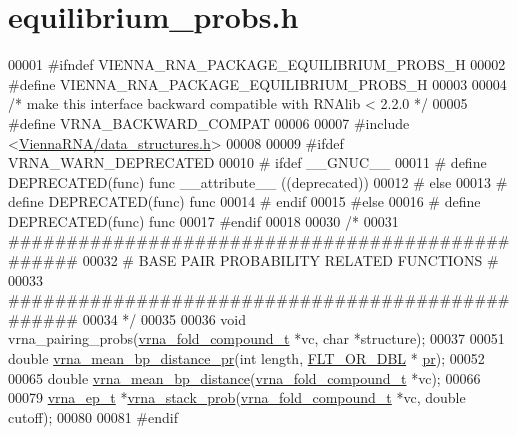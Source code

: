 \hypertarget{equilibrium__probs_8h_source}{}\section{equilibrium\+\_\+probs.\+h}
\label{equilibrium__probs_8h_source}

\begin{DoxyCode}
00001 \textcolor{preprocessor}{#ifndef VIENNA\_RNA\_PACKAGE\_EQUILIBRIUM\_PROBS\_H}
00002 \textcolor{preprocessor}{#define VIENNA\_RNA\_PACKAGE\_EQUILIBRIUM\_PROBS\_H}
00003 
00004 \textcolor{comment}{/* make this interface backward compatible with RNAlib < 2.2.0 */}
00005 \textcolor{preprocessor}{#define VRNA\_BACKWARD\_COMPAT}
00006 
00007 \textcolor{preprocessor}{#include <\hyperlink{data__structures_8h}{ViennaRNA/data\_structures.h}>}
00008 
00009 \textcolor{preprocessor}{#ifdef VRNA\_WARN\_DEPRECATED}
00010 \textcolor{preprocessor}{# ifdef \_\_GNUC\_\_}
00011 \textcolor{preprocessor}{#  define DEPRECATED(func) func \_\_attribute\_\_ ((deprecated))}
00012 \textcolor{preprocessor}{# else}
00013 \textcolor{preprocessor}{#  define DEPRECATED(func) func}
00014 \textcolor{preprocessor}{# endif}
00015 \textcolor{preprocessor}{#else}
00016 \textcolor{preprocessor}{# define DEPRECATED(func) func}
00017 \textcolor{preprocessor}{#endif}
00018 
00030 \textcolor{comment}{/*}
00031 \textcolor{comment}{#################################################}
00032 \textcolor{comment}{# BASE PAIR PROBABILITY RELATED FUNCTIONS       #}
00033 \textcolor{comment}{#################################################}
00034 \textcolor{comment}{*/}
00035 
00036 \textcolor{keywordtype}{void}  vrna\_pairing\_probs(\hyperlink{group__fold__compound_structvrna__fc__s}{vrna\_fold\_compound\_t} *vc, \textcolor{keywordtype}{char} *structure);
00037 
00051 \textcolor{keywordtype}{double} \hyperlink{group__pf__fold_gad3f0c240512e6d43e2e4d4c2076021f5}{vrna\_mean\_bp\_distance\_pr}(\textcolor{keywordtype}{int} length, \hyperlink{group__data__structures_ga31125aeace516926bf7f251f759b6126}{FLT\_OR\_DBL} *
      \hyperlink{fold__vars_8h_ac98ec419070aee6831b44e5c700f090f}{pr});
00052 
00065 \textcolor{keywordtype}{double} \hyperlink{group__pf__fold_gaa6b8983b559b9ef4b2e1b31113ea317b}{vrna\_mean\_bp\_distance}(\hyperlink{group__fold__compound_structvrna__fc__s}{vrna\_fold\_compound\_t} *vc);
00066 
00079 \hyperlink{group__struct__utils_structvrna__elem__prob__s}{vrna\_ep\_t} *\hyperlink{group__pf__fold_ga132664bf29fdc30bb5ea715491d1ab22}{vrna\_stack\_prob}(\hyperlink{group__fold__compound_structvrna__fc__s}{vrna\_fold\_compound\_t} *vc, \textcolor{keywordtype}{double} 
      cutoff);
00080 
00081 \textcolor{preprocessor}{#endif}
\end{DoxyCode}
